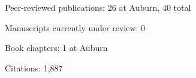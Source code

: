 \begin{veryTightItemize}
    \item Peer-reviewed publications: 26 at Auburn, 40 total
    \item Manuscripts currently under review: 0
    \item Book chapters: 1 at Auburn
    \item Citations: 1,887
\end{veryTightItemize}
